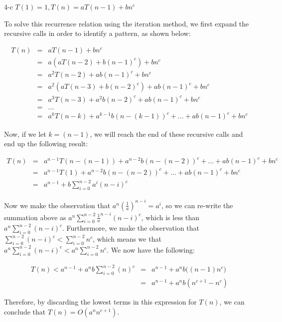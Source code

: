 \documentclass[11pt]{article}
\begin{document}
\begin{prob}{4-c}
$T(1) = 1, T(n) = aT(n-1) + bn^{c}$
\end{prob}
\begin{sol} 

To solve this recurrence relation using the iteration method, we first expand the recursive calls in order to identify a pattern, as shown below:

\begin{eqnarray*}
T(n) & = & aT(n-1) + bn^c \\
& = & a(aT(n-2) + b(n-1)^c) + bn^c \\
& = & a^2T(n-2) + ab(n-1)^c + bn^c\\
& = & a^2(aT(n-3) + b(n-2)^c) + ab(n-1)^c + bn^c \\
& = & a^3T(n-3) + a^2b(n-2)^c + ab(n-1)^c + bn^c \\
& = & ... \\
& = & a^kT(n-k) + a^{k-1}b(n-(k-1))^c + ... + ab(n-1)^c + bn^c
\end{eqnarray*}

Now, if we let $k = (n-1)$, we will reach the end of these recursive calls and end up the following result:

\begin{eqnarray*}
T(n) & = & a^{n-1}T(n-(n-1)) + a^{n-2}b(n-(n-2))^c + ... + ab(n-1)^c + bn^c \\
& = & a^{n-1}T(1) + a^{n-2}b(n-(n-2))^c + ... + ab(n-1)^c + bn^c \\
& = & a^{n-1} + b\sum_{i=0}^{n-2} a^i(n-i)^c
\end{eqnarray*}

Now we make the observation that $a^n(\frac{1}{a})^{n-i} = a^{i}$, so we can re-write the summation above as $a^{n}\sum_{i=0}^{n-2} \frac{1}{a}^{n-i}(n-i)^c$, which is less than $a^{n}\sum_{i=0}^{n-2} (n-i)^c$. Furthermore, we make the observation that $\sum_{i=0}^{n-2} (n-i)^c < \sum_{i=0}^{n-2} n^c$, which means we that $a^{n}\sum_{i=0}^{n-2} (n-i)^c < a^{n}\sum_{i=0}^{n-2} n^c$. We now have the following:

\begin{eqnarray*}
T(n) < a^{n-1} + a^{n}b\sum_{i=0}^{n-2} (n)^c & = & a^{n-1} + a^{n}b\Big( (n-1)n^c \Big) \\
& = & a^{n-1} + a^{n}b(n^{c+1} - n^c)
\end{eqnarray*}

Therefore, by discarding the lowest terms in this expression for $T(n)$, we can conclude that $T(n) = O(a^nn^{c+1})$.

\end{sol}
\end{document}
